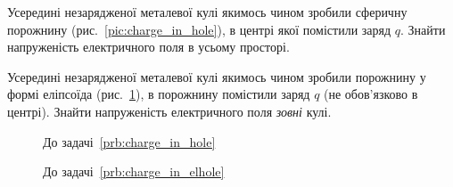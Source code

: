 \begin{problem}\label{prb:charge_in_hole}
Усередині незарядженої металевої кулі якимось чином зробили сферичну порожнину (рис.~\ref{pic:charge_in_hole}), в центрі якої помістили
заряд  $q$.
Знайти напруженість електричного поля в усьому просторі.
\end{problem}

\begin{problem}\label{prb:charge_in_elhole}
Усередині незарядженої металевої кулі якимось чином зробили порожнину у формі еліпсоїда (рис.~\ref{pic:charge_in_elhole}), в порожнину помістили
заряд  $q$ (не обов’язково в центрі).
Знайти напруженість електричного поля \emph{зовні} кулі.
\end{problem}

\begin{figure}[h!]\centering
\begin{minipage}[t]{0.45\linewidth}\centering
		\caption{До задачі~\ref{prb:charge_in_hole}}
		\label{pic:charge_in_hole}
\end{minipage}
\begin{minipage}[t]{0.45\linewidth}\centering
		\caption{До задачі~\ref{prb:charge_in_elhole}}
		\label{pic:charge_in_elhole}
\end{minipage}
\end{figure}





